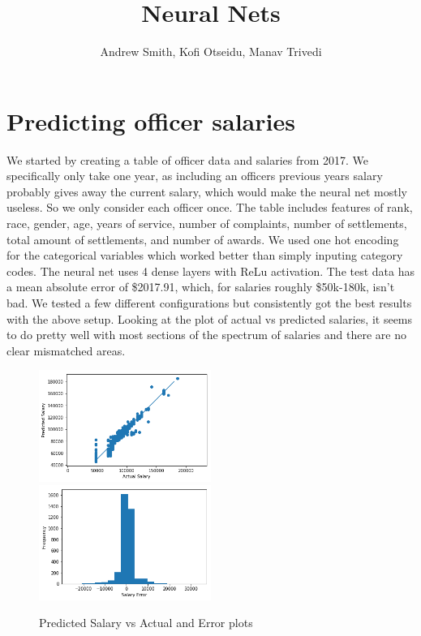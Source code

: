 \documentclass[11pt]{article}
\author{Andrew Smith, Kofi Otseidu, Manav Trivedi}
\title{Neural Nets}
\begin{document}
\maketitle

\section{Predicting officer salaries}

We started by creating a table of officer data and salaries from 2017. We specifically only take one year, as including an officers previous years salary probably gives away the current salary, which would make the neural net mostly useless. So we only consider each officer once. The table includes features of rank, race, gender, age, years of service, number of complaints, number of settlements, total amount of settlements, and number of awards. We used one hot encoding for the categorical variables which worked better than simply inputing category codes. The neural net uses 4 dense layers with ReLu activation. The test data has a mean absolute error of \$2017.91, which, for salaries roughly \$50k-180k, isn't bad. We tested a few different configurations but consistently got the best results with the above setup. Looking at the plot of actual vs predicted salaries, it seems to do pretty well with most sections of the spectrum of salaries and there are no clear mismatched areas.

\begin{figure}[h]
\caption{Predicted Salary vs Actual and Error plots}
\includegraphics[width=0.5\textwidth]{pred.png}
\includegraphics[width=0.5\textwidth]{error.png}
\end{figure}
\end{document}
